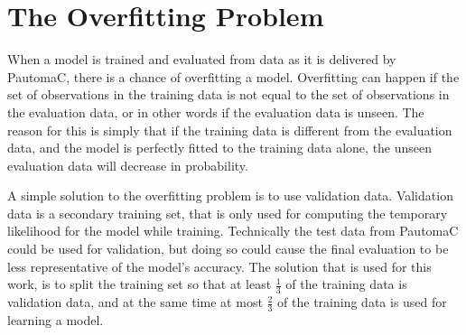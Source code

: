 \section{The Overfitting Problem}
When a model is trained and evaluated from data as it is delivered by PautomaC, there is a chance of overfitting a model. Overfitting can happen if the set of observations in the training data is not equal to the set of observations in the evaluation data, or in other words if the evaluation data is unseen. The reason for this is simply that if the training data is different from the evaluation data, and the model is perfectly fitted to the training data alone, the unseen evaluation data will decrease in probability.

A simple solution to the overfitting problem is to use validation data. Validation data is a secondary training set, that is only used for computing the temporary likelihood for the model while training. Technically the test data from PautomaC could be used for validation, but doing so could cause the final evaluation to be less representative of the model's accuracy. The solution that is used for this work, is to split the training set so that at least $\frac{1}{3}$ of the training data is validation data, and at the same time at most $\frac{2}{3}$ of the training data is used for learning a model.